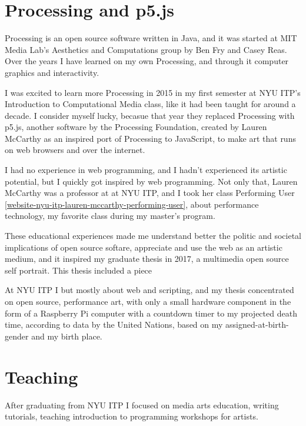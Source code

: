 \section{Processing and p5.js}

Processing is an open source software written in Java, and it was started at MIT Media Lab's Aesthetics and Computations group by Ben Fry and Casey Reas. Over the years I have learned on my own Processing, and through it computer graphics and interactivity.

I was excited to learn more Processing in 2015 in my first semester at \acrshort{NYU} \acrshort{ITP}'s Introduction to Computational Media class, like it had been taught for around a decade. I consider myself lucky, becasue that year they replaced Processing with p5.js, another software by the Processing Foundation, created by Lauren McCarthy as an inspired port of Processing to JavaScript, to make art that runs on web browsers and over the internet.

I had no experience in web programming, and I hadn't experienced its artistic potential, but I quickly got inspired by web programming. Not only that, Lauren McCarthy was a professor at at \acrshort{NYU} \acrshort{ITP}, and I took her class Performing User \ref{website-nyu-itp-lauren-mccarthy-performing-user}, about performance technology, my favorite class during my master's program.

These educational experiences made me understand better the politic and societal implications of open source softare, appreciate and use the web as an artistic medium, and it inspired my graduate thesis in 2017, a multimedia open source self portrait. This thesis included a piece 


At \acrshort{NYU} \acrshort{ITP} I but mostly about web and scripting, and my thesis concentrated on open source, performance art, with only a small hardware component in the form of a Raspberry Pi computer with a countdown timer to my projected death time, according to data by the United Nations, based on my assigned-at-birth-gender and my birth place.

\section{Teaching}

After graduating from \acrshort{NYU} \acrshort{ITP} I focused on media arts education, writing tutorials, teaching introduction to programming workshops for artists.

